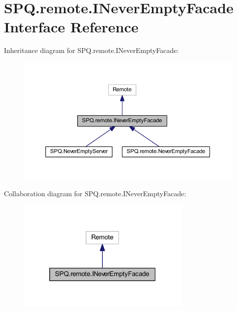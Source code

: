 \hypertarget{interface_s_p_q_1_1remote_1_1_i_never_empty_facade}{}\section{S\+P\+Q.\+remote.\+I\+Never\+Empty\+Facade Interface Reference}
\label{interface_s_p_q_1_1remote_1_1_i_never_empty_facade}


Inheritance diagram for S\+P\+Q.\+remote.\+I\+Never\+Empty\+Facade\+:
\nopagebreak
\begin{figure}[H]
\begin{center}
\leavevmode
\includegraphics[width=350pt]{interface_s_p_q_1_1remote_1_1_i_never_empty_facade__inherit__graph}
\end{center}
\end{figure}


Collaboration diagram for S\+P\+Q.\+remote.\+I\+Never\+Empty\+Facade\+:
\nopagebreak
\begin{figure}[H]
\begin{center}
\leavevmode
\includegraphics[width=241pt]{interface_s_p_q_1_1remote_1_1_i_never_empty_facade__coll__graph}
\end{center}
\end{figure}
